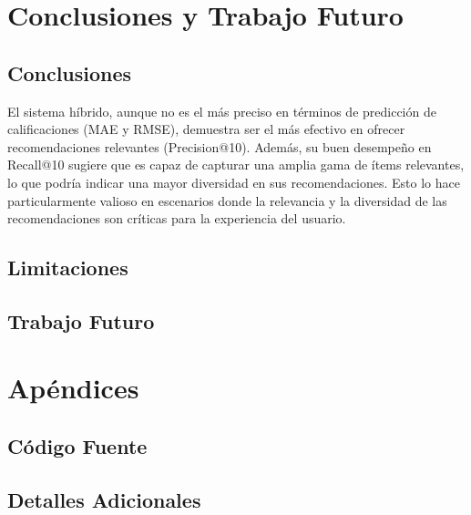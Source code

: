 \documentclass[a4paper,12pt]{report}
\begin{document}
\chapter{Conclusiones y Trabajo Futuro}
    \section{Conclusiones}

    El sistema híbrido, aunque no es el más preciso en términos de predicción de calificaciones (MAE y RMSE), demuestra ser el más efectivo en ofrecer recomendaciones relevantes (Precision@10). Además, su buen desempeño en Recall@10 sugiere que es capaz de capturar una amplia gama de ítems relevantes, lo que podría indicar una mayor diversidad en sus recomendaciones. Esto lo hace particularmente valioso en escenarios donde la relevancia y la diversidad de las recomendaciones son críticas para la experiencia del usuario.
    \section{Limitaciones}
    \section{Trabajo Futuro}

\appendix
\chapter{Apéndices}
\section{Código Fuente}
\section{Detalles Adicionales}





\end{document}
